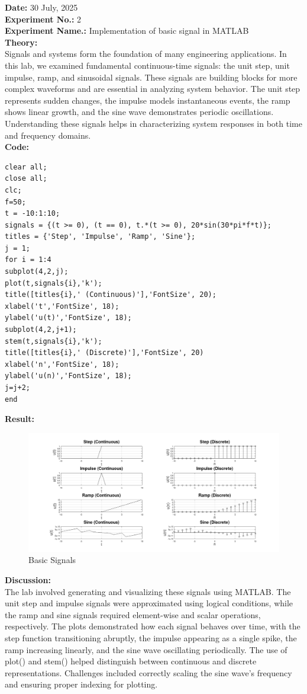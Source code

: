 \documentclass[12pt, a4paper]{article}
\begin{document}
\noindent\textbf{Date: }30 July, 2025
\\
\textbf{Experiment No.: }2
\\
\textbf{Experiment Name.: }Implementation of basic signal in MATLAB
\\
\textbf{Theory: } \\
Signals and systems form the foundation of many engineering applications. In this lab, we examined fundamental continuous-time signals: the unit step, unit impulse, ramp, and sinusoidal signals. These signals are building blocks for more complex waveforms and are essential in analyzing system behavior. The unit step represents sudden changes, the impulse models instantaneous events, the ramp shows linear growth, and the sine wave demonstrates periodic oscillations. Understanding these signals helps in characterizing system responses in both time and frequency domains.
\\ \textbf{Code: }
\begin{Verbatim}
clear all;
close all;
clc;
f=50;
t = -10:1:10;
signals = {(t >= 0), (t == 0), t.*(t >= 0), 20*sin(30*pi*f*t)};
titles = {'Step', 'Impulse', 'Ramp', 'Sine'};
j = 1;
for i = 1:4
subplot(4,2,j);
plot(t,signals{i},'k');
title([titles{i},' (Continuous)'],'FontSize', 20);
xlabel('t','FontSize', 18);
ylabel('u(t)','FontSize', 18);
subplot(4,2,j+1);
stem(t,signals{i},'k');
title([titles{i},' (Discrete)'],'FontSize', 20)
xlabel('n','FontSize', 18);
ylabel('u(n)','FontSize', 18);
j=j+2;
end
\end{Verbatim}
\textbf{Result: }
\begin{figure}[h]
    \centering
    \includegraphics[width=0.9\linewidth]{plots.png}
    \caption{Basic Signals}
    \label{fig:placeholder}
\end{figure}



\noindent \textbf{Discussion: }\\
The lab involved generating and visualizing these signals using MATLAB. The unit step and
impulse signals were approximated using logical conditions, while the ramp and sine signals
required element-wise and scalar operations, respectively. The plots demonstrated how each
signal behaves over time, with the step function transitioning abruptly, the impulse appearing
as a single spike, the ramp increasing linearly, and the sine wave oscillating periodically. The
use of plot() and stem() helped distinguish between continuous and discrete representations.
Challenges included correctly scaling the sine wave’s frequency and ensuring proper indexing
for plotting.
\vspace{10pt}
\end{document}
